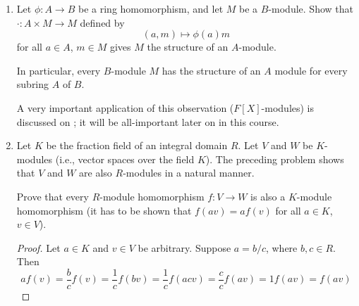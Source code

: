 \documentclass[../psets.tex]{subfiles}
\begin{document}
\begin{enumerate}
\begin{proof}
        At this point, we may define $\psi:M\oplus\ker(g)\to e(N)\oplus\ker(e)$ by $\psi(m,n)=(\tilde{f}(m),\id(n))$ for all $(m,n)\in M\oplus\ker(g)$. As a componentwise $A$-module isomorphism, $\psi$ is also an $A$-module isomorphism, itself (see the analogous justification in Problem 3.2). Thus, we may define the $A$-module isomorphism $H=\phi\circ\psi$, where the fact that $H$ is an $A$-module homomorphism is justified by Proposition 10.2 and the fact that it is bijective follows from the bijectivity of both $\phi,\psi$. $H$, as defined, maps the correct sets (i.e., $M\oplus\ker(g)\to N$) and has the correct rule:
        \begin{equation*}
            H(m,n) = (\phi\circ\psi)(m,n)
            = \phi(\psi(m,n))
            = \phi(\tilde{f}(m),n)
            = \phi(f(m),n)
            = f(m)+n
        \end{equation*}
    \end{proof}
    \item Let $\phi:A\to B$ be a ring homomorphism, and let $M$ be a $B$-module. Show that $\cdot:A\times M\to M$ defined by
    \begin{equation*}
        (a,m) \mapsto \phi(a)m
    \end{equation*}
    for all $a\in A$, $m\in M$ gives $M$ the structure of an $A$-module.\par
    In particular, every $B$-module $M$ has the structure of an $A$ module for every subring $A$ of $B$.\par
    A very important application of this observation ($F[X]$-modules) is discussed on \textcite[340]{bib:DummitFoote}; it will be all-important later on in this course. %
    \item Let $K$ be the fraction field of an integral domain $R$. Let $V$ and $W$ be $K$-modules (i.e., vector spaces over the field $K$). The preceding problem shows that $V$ and $W$ are also $R$-modules in a natural manner.\par
    Prove that every $R$-module homomorphism $f:V\to W$ is also a $K$-module homomorphism (it has to be shown that $f(av)=af(v)$ for all $a\in K$, $v\in V$).
    \begin{proof}
        Let $a\in K$ and $v\in V$ be arbitrary. Suppose $a=b/c$, where $b,c\in R$. Then
        \begin{equation*}
            af(v) = \frac{b}{c}f(v)
            = \frac{1}{c}f(bv)
            = \frac{1}{c}f(acv)
            = \frac{c}{c}f(av)
            = 1f(av)
            = f(av)
        \end{equation*}

\end{proof}
\end{enumerate}
\end{document}
